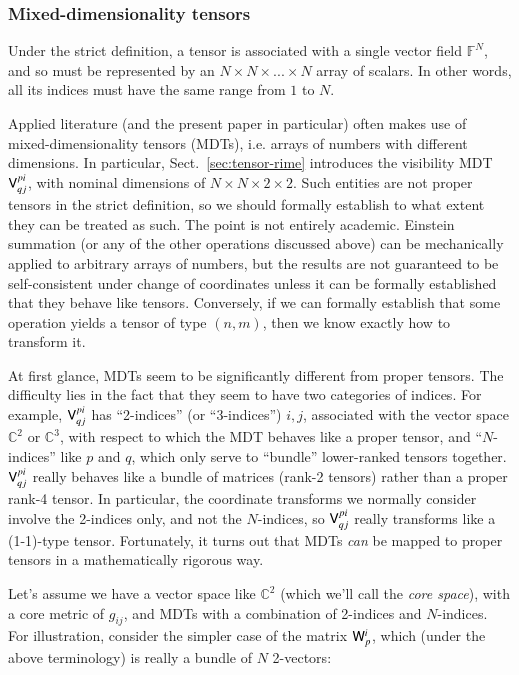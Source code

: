 \documentclass[]{aa}
\begin{document}
\subsubsection{Mixed-dimensionality tensors}
\label{sec:tensors-mixed-dim}

Under the strict definition, a tensor is associated with a single vector field $\mathbb{F}^N$, and so must be represented by an $N\times N\times...\times N$ array of scalars. In other words, all its indices must have the same range from $1$ to $N$.

Applied literature (and the present paper in particular) often makes use of mixed-dimensionality tensors (MDTs), i.e. arrays of numbers with different dimensions. In particular, Sect.~\ref{sec:tensor-rime} introduces the visibility MDT $\mathsf{V}^{pi}_{qj}$, with nominal dimensions of $N\times N\times 2\times2$. Such entities are not proper tensors in the strict definition, so we should formally establish to what extent they can be treated as such. The point is not entirely academic. Einstein summation (or any of the other operations discussed above) can be mechanically 
applied to arbitrary arrays of numbers, but the results are not guaranteed to be self-consistent under change of coordinates unless it can be formally established that they behave like tensors. Conversely, if we can formally establish that some operation yields a tensor of type $(n,m)$, then we know exactly how to transform it.

At first glance, MDTs seem to be significantly different from proper tensors. The difficulty lies in the fact that they seem to have two categories of indices. For example, $\mathsf{V}^{pi}_{qj}$  has ``2-indices'' (or ``3-indices'') $i,j$, associated with the vector space $\mathbb{C}^2$ or $\mathbb{C}^3$, with respect to which the MDT behaves like a proper tensor, and ``$N$-indices'' like $p$ and $q$, which only serve to ``bundle'' lower-ranked tensors together. $\mathsf{V}^{pi}_{qj}$ really behaves like a bundle of matrices (rank-2 tensors) rather than a proper rank-4 tensor. In particular, the coordinate transforms we normally consider involve the 2-indices only, and not the $N$-indices, so $\mathsf{V}^{pi}_{qj}$ really transforms like a (1-1)-type tensor. Fortunately, it turns out that MDTs \emph{can} be mapped to proper tensors in a mathematically rigorous way.

Let's assume we have a vector space like $\mathbb{C}^2$ (which we'll call the \emph{core space\/}), with a core metric of $g_{ij}$, and MDTs with a combination of 2-indices and $N$-indices. For illustration, consider the simpler case of the matrix $\mathsf{W}^i_p$, which (under the above terminology) is really a bundle of $N$ 2-vectors:
\end{document}
